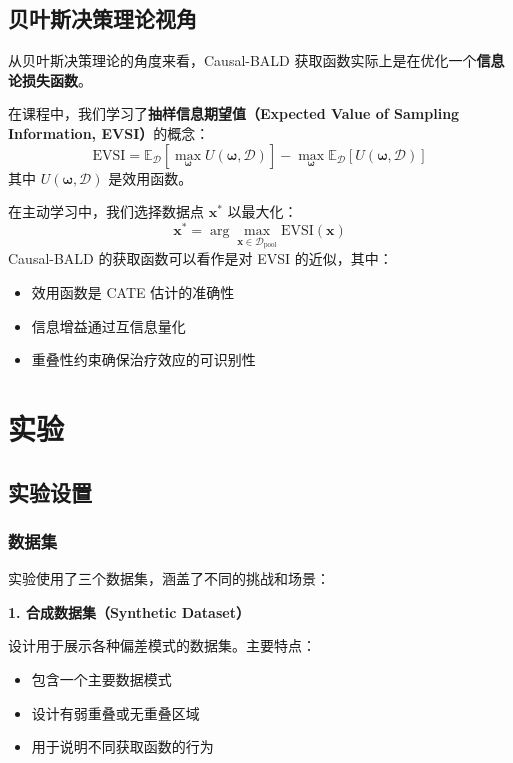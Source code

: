 \documentclass[12pt]{article}
\begin{document}
\subsection{贝叶斯决策理论视角}

从贝叶斯决策理论的角度来看，Causal-BALD 获取函数实际上是在优化一个\textbf{信息论损失函数}。

在课程中，我们学习了\textbf{抽样信息期望值（Expected Value of Sampling Information, EVSI）}的概念：
\begin{equation}
\text{EVSI} = \mathbb{E}_{\mathcal{D}}[\max_{\boldsymbol{\omega}} U(\boldsymbol{\omega}, \mathcal{D})] - \max_{\boldsymbol{\omega}} \mathbb{E}_{\mathcal{D}}[U(\boldsymbol{\omega}, \mathcal{D})]
\end{equation}
其中 $U(\boldsymbol{\omega}, \mathcal{D})$ 是效用函数。

在主动学习中，我们选择数据点 $\mathbf{x}^*$ 以最大化：
\begin{equation}
\mathbf{x}^* = \arg\max_{\mathbf{x} \in \mathcal{D}_{\text{pool}}} \text{EVSI}(\mathbf{x})
\end{equation}
Causal-BALD 的获取函数可以看作是对 EVSI 的近似，其中：
\begin{itemize}
\item 效用函数是 CATE 估计的准确性
\item 信息增益通过互信息量化
\item 重叠性约束确保治疗效应的可识别性
\end{itemize}

\section{实验}

\subsection{实验设置}

\subsubsection{数据集}

实验使用了三个数据集，涵盖了不同的挑战和场景：

\textbf{1. 合成数据集（Synthetic Dataset）}

设计用于展示各种偏差模式的数据集。主要特点：
\begin{itemize}
\item 包含一个主要数据模式
\item 设计有弱重叠或无重叠区域
\item 用于说明不同获取函数的行为
\end{itemize}
\end{document}
